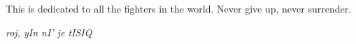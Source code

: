 This is dedicated to all the fighters in the world. Never give up, never surrender.

\begin{flushright}
\textit{roj, yIn nI' je tISIQ}
\end{flushright}
